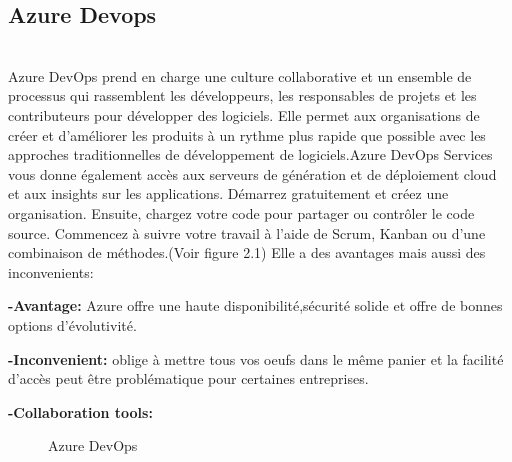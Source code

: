\subsection{\LARGE Azure Devops}
\texttt{}\\[0.1cm]
\textsf{\selectfont{}Azure DevOps prend en charge une culture collaborative et un ensemble de processus qui rassemblent les développeurs, les responsables de projets et les contributeurs pour développer des logiciels. Elle permet aux organisations de créer et d’améliorer les produits à un rythme plus rapide que possible avec les approches traditionnelles de développement de logiciels.Azure DevOps Services vous donne également accès aux serveurs de génération et de déploiement cloud et aux insights sur les applications. Démarrez gratuitement et créez une organisation. Ensuite, chargez votre code pour partager ou contrôler le code source. Commencez à suivre votre travail à l’aide de Scrum, Kanban ou d’une combinaison de méthodes.(Voir figure 2.1)\cite{9}}
\textsf{\selectfont{}Elle a des avantages mais aussi des inconvenients:}\\[0.1cm]
\par \noindent \textbf{\Large -Avantage:}
\textsf{\selectfont{}Azure offre une haute disponibilité,sécurité solide et offre de bonnes options d’évolutivité.}\\[0.1cm]
\par \noindent \textbf{\Large -Inconvenient:}
\textsf{\selectfont{}oblige à mettre tous vos oeufs dans le même panier et la facilité d’accès peut être problématique pour certaines entreprises.}\\[0.1cm]
\par \noindent \textbf{\Large -Collaboration tools:}
\textsf{\selectfont{}}
\begin{figure}[H]
    \begin{center}
    

    \end{center}
    
    \caption{Azure DevOps}
\end{figure}

